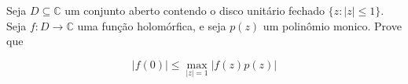 Seja \(D \subseteq \mathbb{C}\) um conjunto aberto contendo o disco unitário fechado \(\{z \colon  |z| \leq 1\}\). Seja \(f \colon  D \to \mathbb{C}\) uma função holomórfica, e seja \(p(z)\) um polinômio monico. Prove que

\[
|f(0)| \leq \max_{|z|=1} |f(z)p(z)|
\]
